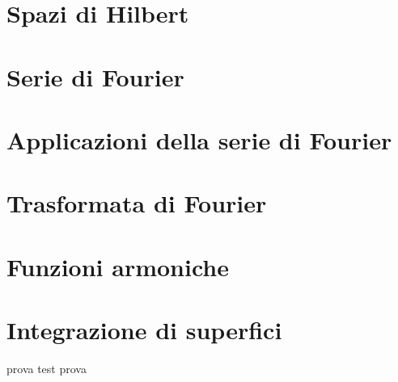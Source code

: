 \documentclass[a4paper, 11pt]{report}
\begin{document}

\chapter{Spazi di Hilbert}


\chapter{Serie di Fourier}


\chapter{Applicazioni della serie di Fourier}


\chapter{Trasformata di Fourier}


\chapter{Funzioni armoniche}


\chapter{Integrazione di superfici}


\newpage

prova test prova 
\end{document}
